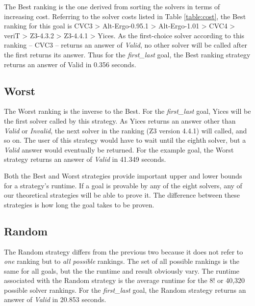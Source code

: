 The \textsf{Best} ranking is the one derived from sorting the solvers in terms of increasing cost. 
Referring to the solver costs listed in Table \ref{table:cost}, the \textsf{Best} ranking for this goal is
CVC3 > Alt-Ergo-0.95.1 > Alt-Ergo-1.01 > CVC4 > veriT > Z3-4.3.2 > Z3-4.4.1 > Yices. 
As the first-choice solver according to this ranking -- CVC3 -- returns an answer of \textit{Valid}, no other solver will be called after the first returns its answer. 
Thus for the \textit{first\_last} goal, the \textsf{Best} ranking strategy returns an answer of \textsf{Valid} in 0.356 seconds.   

\subsection{\textsf{Worst}}

The \textsf{Worst} ranking is the inverse to the \textsf{Best}. 
For the \textit{first\_last} goal, Yices will be the first solver called by this strategy.
As Yices returns an answer other than \textit{Valid} or \textit{Invalid}, the next solver in the ranking (Z3 version 4.4.1) will called, and so on.
The user of this strategy would have to wait until the eighth solver, but a \textit{Valid} answer would eventually be returned.
For the example goal, the \textsf{Worst} strategy returns an answer of \textit{Valid} in 41.349 seconds.

Both the \textsf{Best} and \textsf{Worst} strategies provide important upper and lower bounds for a strategy's runtime.
If a goal is provable by any of the eight solvers, any of our theoretical strategies will be able to prove it.
The difference between these strategies is how long the goal takes to be proven.  

\subsection{\textsf{Random}}

The \textsf{Random} strategy differs from the previous two because it does not refer to \textit{one} ranking but to \textit{all possible} rankings.
The set of all possible rankings is the same for all goals, but the the runtime and result obviously vary. 
The runtime associated with the \textsf{Random} strategy is the average runtime for the 8! or 40,320 possible solver rankings.
For the \textit{first\_last} goal, the \textsf{Random} strategy returns an answer of \textit{Valid} in 20.853 seconds.


